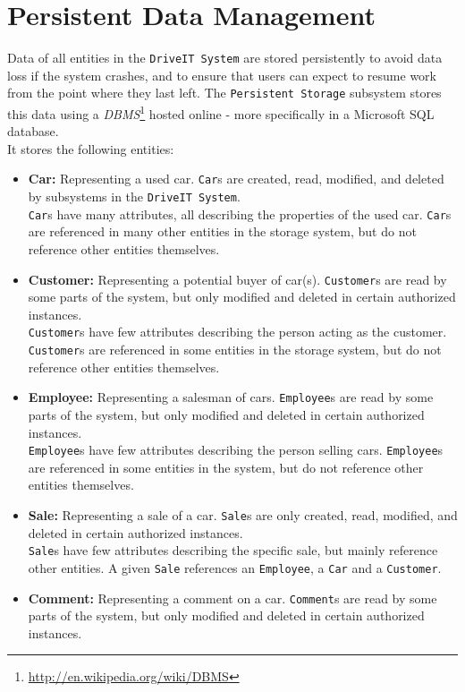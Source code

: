 \section{Persistent Data Management}
Data of all entities in the \texttt{DriveIT System} are stored persistently to avoid data loss if the system crashes, and to ensure that users can expect to resume work from the point where they last left.
The \texttt{Persistent Storage} subsystem stores this data using a \textit{DBMS}\footnote{\url{http://en.wikipedia.org/wiki/DBMS}} hosted online - more specifically in a Microsoft SQL database.\\

It stores the following entities:
\begin{itemize}
	\item \textbf{Car:} Representing a used car. \texttt{Car}s are created, read, modified, and deleted by subsystems in the \texttt{DriveIT System}.\\
	\texttt{Car}s have many attributes, all describing the properties of the used car. \texttt{Car}s are referenced in many other entities in the storage system, but do not reference other entities themselves.
	\item \textbf{Customer:} Representing a potential buyer of car(s). \texttt{Customer}s are read by some parts of the system, but only modified and deleted in certain authorized instances.\\
	\texttt{Customer}s have few attributes describing the person acting as the customer. \texttt{Customer}s are referenced in some entities in the storage system, but do not reference other entities themselves.
	\item \textbf{Employee:} Representing a salesman of cars. \texttt{Employee}s are read by some parts of the system, but only modified and deleted in certain authorized instances.\\
	\texttt{Employee}s have few attributes describing the person selling cars. \texttt{Employee}s are referenced in some entities in the system, but do not reference other entities themselves.
	\item \textbf{Sale:} Representing a sale of a car. \texttt{Sale}s are only created, read, modified, and deleted in certain authorized instances.\\
	\texttt{Sale}s have few attributes describing the specific sale, but mainly reference other entities. A given \texttt{Sale} references an \texttt{Employee}, a \texttt{Car} and a \texttt{Customer}.
	\item \textbf{Comment:} Representing a comment on a car. \texttt{Comment}s are read by some parts of the system, but only modified and deleted in certain authorized instances.\\

\end{itemize}
